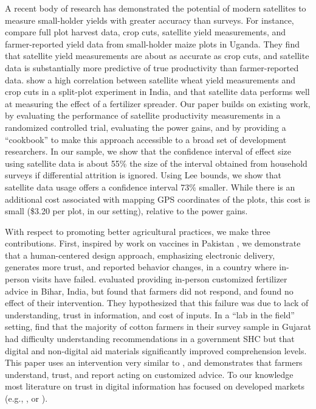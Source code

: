 \documentclass{article}
\begin{document}
A recent body of research has demonstrated the potential of modern satellites to measure small-holder yields with greater accuracy than surveys. For instance, \citet{Lobell2019EyesAnalysis} compare full plot harvest data, crop cuts, satellite yield measurements, and farmer-reported yield data from small-holder maize plots in Uganda. They find that satellite yield measurements are about as accurate as crop cuts, and satellite data is substantially more predictive of true productivity than farmer-reported data. \citet{Jain2019TheData} show a high correlation between satellite wheat yield measurements and crop cuts in a split-plot experiment in India, and that satellite data performs well at measuring the effect of a fertilizer spreader. Our paper builds on existing work, by evaluating the performance of satellite productivity measurements in a randomized controlled trial, evaluating the power gains, and by providing a ``cookbook'' to make this approach accessible to a broad set of development researchers. In our sample, we show that the confidence interval of effect size using satellite data is about 55\% the size of the interval obtained from household surveys if differential attrition is ignored. Using Lee bounds, we show that satellite data usage offers a confidence interval 73\% smaller. While there is an additional cost associated with mapping GPS coordinates of the plots, this cost is small (\$3.20 per plot, in our setting), relative to the power gains. 

With respect to promoting better agricultural practices, we make three contributions. First, inspired by work on vaccines in Pakistan \citep{Usman2011RandomizedEducation}, we demonstrate that a human-centered design approach, emphasizing electronic delivery, generates more trust, and reported behavior changes, in a country where in-person visits have failed. \citet{Fishman2016CanBihar} evaluated providing in-person customized fertilizer advice in Bihar, India, but found that farmers did not respond, and found no effect of their intervention. They hypothesized that this failure was due to lack of understanding, trust in information, and cost of inputs. In a ``lab in the field'' setting, \citet{Cole2017TheAgriculture} find that the majority of cotton farmers in their survey sample in Gujarat had difficulty understanding recommendations in a government SHC but that digital and non-digital aid materials significantly improved comprehension levels. This paper uses an intervention very similar to \citet{Cole2017TheAgriculture}, and demonstrates that farmers understand, trust, and report acting on customized advice. To our knowledge most literature on trust in digital information has focused on developed markets (e.g., \citet{Sillence2006AAdvice}, or \citet{Bonhard2006KnowingSystems}).
\end{document}
